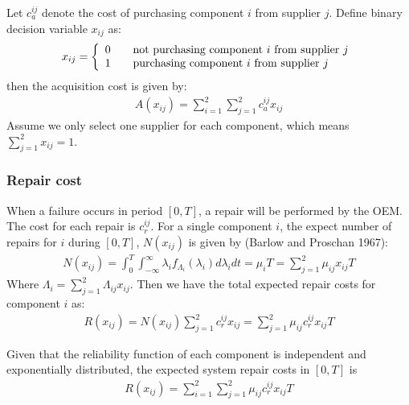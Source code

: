 \documentclass[preprint,12pt]{elsarticle}
\begin{document}
	Let $c^{ij}_{a}$ denote the cost of purchasing component $i$ from supplier $j$. Define binary decision variable $x_{ij}$ as:
	\[ x_{ij} = \left \{
	  \begin{array} {l l}
		0 & \quad \text {not purchasing component $i$ from supplier $j$} \\
		1 & \quad \text {purchasing component $i$ from supplier $j$}
		\end {array} \right.\]
		then the acquisition cost is given by:
	 \begin{eqnarray}
	A(x_{ij})=\sum ^{2}_{i=1}\sum^{2}_{j=1} {c^{ij}_{a} x_{ij}}
		 \end{eqnarray}
Assume we only select one supplier for each component, which means $\sum^{2}_{j=1}{x_{ij}=1}$.	
	
	\subsubsection{Repair cost}
	
When a failure occurs in period $[0, T]$, a repair will be performed by the OEM. The cost for each repair is $c_r^{ij}$. For a single component $i$, the expect number of repairs for $i$ during $[0,T]$, $N(x_{ij})$ is given by (Barlow and Proschan 1967):
\begin {eqnarray}
N(x_{ij})=\int_0^{T}\int_{-\infty}^{\infty}{{\lambda}_{i}f_{\Lambda_{i}}({\lambda}_{i})d{\lambda}_{i}dt}=\mu_{i}T=\sum_{j=1}^{2}{\mu_{ij}x_{ij}}T
\end {eqnarray}
Where $\Lambda_{i}=\sum_{j=1}^{2}{\Lambda}_{ij}x_{ij}$. Then we have the total expected repair costs for component $i$ as:
\begin {eqnarray}
R(x_{ij})=N(x_{ij})\sum_{j=1}^{2}{c_r^{ij}x_{ij}}=\sum_{j=1}^{2}{\mu_{ij}c_r^{ij}x_{ij}}T
\end {eqnarray}

Given that the reliability function of each component is independent and exponentially distributed, the expected system repair costs in $[0,T]$ is
\begin {eqnarray}
R(x_{ij})=\sum_{i=1}^{2}\sum_{j=1}^{2}{\mu_{ij}c_r^{ij}x_{ij}}T
\end {eqnarray}
\end{document}

